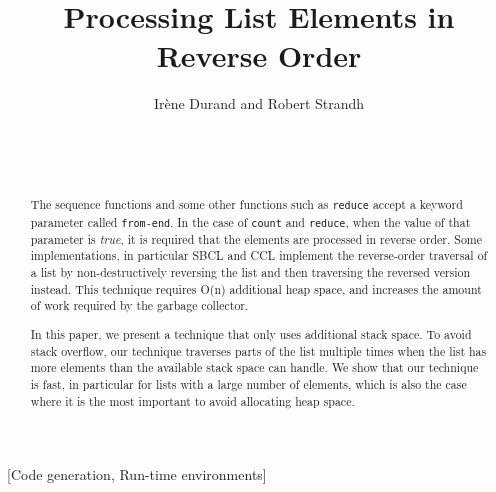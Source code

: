 \documentclass{acm_proc_article-sp}
\def\inputtex#1{}
\begin{document}
\title{Processing List Elements in Reverse Order}
\author{\alignauthor
Irène Durand and Robert Strandh\\
\\
\\
\\
}


\maketitle

\begin{abstract}
The \commonlisp{} sequence functions and some other functions such as
\texttt{reduce} accept a keyword parameter called \texttt{from-end}.
In the case of \texttt{count} and \texttt{reduce}, when the value of
that parameter is \emph{true}, it is required that the elements are
processed in reverse order.  Some implementations, in particular SBCL
and CCL implement the reverse-order traversal of a list by
non-destructively reversing the list and then traversing the reversed
version instead.  This technique requires O(n) additional heap space,
and increases the amount of work required by the garbage collector.

In this paper, we present a technique that only uses additional stack
space.  To avoid stack overflow, our technique traverses parts of the
list multiple times when the list has more elements than the available
stack space can handle.  We show that our technique is fast, in
particular for lists with a large number of elements, which is also
the case where it is the most important to avoid allocating heap
space.
\end{abstract}

[Code generation, Run-time environments]



\inputtex{sec-introduction.tex}
\inputtex{sec-previous.tex}
\inputtex{sec-our-method.tex}
\inputtex{sec-benefits.tex}
\inputtex{sec-conclusions.tex}



\end{document}
